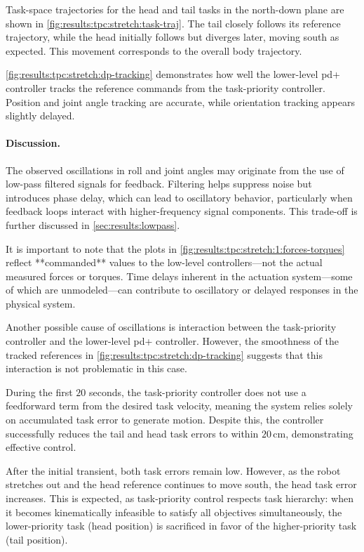 Task-space trajectories for the head and tail tasks in the north-down plane are shown in \autoref{fig:results:tpc:stretch:task-traj}. The tail closely follows its reference trajectory, while the head initially follows but diverges later, moving south as expected. This movement corresponds to the overall body trajectory.

\autoref{fig:results:tpc:stretch:dp-tracking} demonstrates how well the lower-level \gls{pd+} controller tracks the reference commands from the task-priority controller. Position and joint angle tracking are accurate, while orientation tracking appears slightly delayed.

\paragraph{Discussion.}

The observed oscillations in roll and joint angles may originate from the use of low-pass filtered signals for feedback. Filtering helps suppress noise but introduces phase delay, which can lead to oscillatory behavior, particularly when feedback loops interact with higher-frequency signal components. This trade-off is further discussed in \autoref{sec:results:lowpass}.

It is important to note that the plots in \autoref{fig:results:tpc:stretch:1:forces-torques} reflect **commanded** values to the low-level controllers—not the actual measured forces or torques. Time delays inherent in the actuation system—some of which are unmodeled—can contribute to oscillatory or delayed responses in the physical system.

Another possible cause of oscillations is interaction between the task-priority controller and the lower-level \gls{pd+} controller. However, the smoothness of the tracked references in \autoref{fig:results:tpc:stretch:dp-tracking} suggests that this interaction is not problematic in this case.

During the first \(20\) seconds, the task-priority controller does not use a feedforward term from the desired task velocity, meaning the system relies solely on accumulated task error to generate motion. Despite this, the controller successfully reduces the tail and head task errors to within \(20\,\mathrm{cm}\), demonstrating effective control.

After the initial transient, both task errors remain low. However, as the robot stretches out and the head reference continues to move south, the head task error increases. This is expected, as task-priority control respects task hierarchy: when it becomes kinematically infeasible to satisfy all objectives simultaneously, the lower-priority task (head position) is sacrificed in favor of the higher-priority task (tail position).

